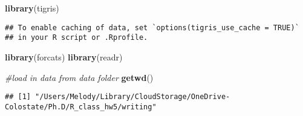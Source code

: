 \documentclass[
]{article}
\newenvironment{Shaded}{\begin{snugshade}}{\end{snugshade}}
\newcommand{\CommentTok}[1]{\textcolor[rgb]{0.56,0.35,0.01}{\textit{#1}}}
\newcommand{\FunctionTok}[1]{\textcolor[rgb]{0.13,0.29,0.53}{\textbf{#1}}}
\newcommand{\NormalTok}[1]{#1}
\begin{document}
\begin{Shaded}
\begin{Highlighting}[]
\FunctionTok{library}\NormalTok{(tigris)}
\end{Highlighting}
\end{Shaded}

\begin{verbatim}
## To enable caching of data, set `options(tigris_use_cache = TRUE)`
## in your R script or .Rprofile.
\end{verbatim}

\begin{Shaded}
\begin{Highlighting}[]
\FunctionTok{library}\NormalTok{(forcats)}
\FunctionTok{library}\NormalTok{(readr)}


\CommentTok{\#load in data from data folder}
\FunctionTok{getwd}\NormalTok{()}
\end{Highlighting}
\end{Shaded}

\begin{verbatim}
## [1] "/Users/Melody/Library/CloudStorage/OneDrive-Colostate/Ph.D/R_class_hw5/writing"
\end{verbatim}
\end{document}
